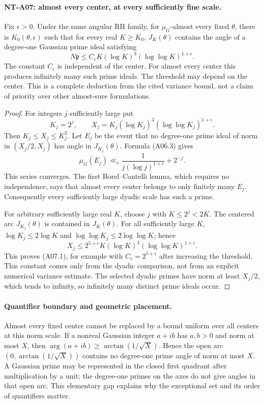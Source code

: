 \paragraph{NT-A07: almost every center, at every sufficiently fine scale.}
Fix \(\epsilon>0\). Under the same angular RH family, for
\(\mu_G\)-almost every fixed \(\theta\), there is
\(K_0(\theta,\epsilon)\) such that for every real \(K\ge K_0\),
\(J_K(\theta)\) contains the angle of a degree-one Gaussian prime
ideal satisfying
\[
 N\mathfrak p\le C_\epsilon
              K(\log K)^3(\log\log K)^{1+\epsilon}.       \tag{A07.1}
\]
The constant \(C_\epsilon\) is independent of the center.
For almost every center this produces infinitely many such prime
ideals. The threshold may depend on the center. This is a
complete deduction from the cited variance bound, not a claim
of priority over other almost-sure formulations.

\begin{proof}
For integers \(j\) sufficiently large put
\[
 K_j=2^j,\qquad
 X_j=K_j(\log K_j)^3(\log\log K_j)^{1+\epsilon}.
\]
Then \(K_j\le X_j\le K_j^2\). Let \(E_j\) be the event that
no degree-one prime ideal of norm in \((X_j/2,X_j)\) has angle
in \(J_{K_j}(\theta)\). Formula (A06.3) gives
\[
 \mu_G(E_j)\ll_\epsilon
      \frac1{j(\log j)^{1+\epsilon}}+2^{-j}.
\]
This series converges. The first Borel--Cantelli lemma, which
requires no independence, says that almost every center belongs
to only finitely many \(E_j\). Consequently every sufficiently
large dyadic scale has such a prime.

For arbitrary sufficiently large real \(K\), choose \(j\) with
\(K\le 2^j<2K\). The centered arc \(J_{K_j}(\theta)\) is contained
in \(J_K(\theta)\). For all sufficiently large \(K\),
\(\log K_j\le2\log K\) and
\(\log\log K_j\le2\log\log K\); hence
\[
 X_j\le 2^{5+\epsilon}
           K(\log K)^3(\log\log K)^{1+\epsilon}.
\]
This proves (A07.1), for example with \(C_\epsilon=2^{5+\epsilon}\)
after increasing the threshold. This constant comes only from
the dyadic comparison, not from an explicit numerical variance
estimate. The selected dyadic primes have norm at least \(X_j/2\),
which tends to infinity, so infinitely many distinct prime ideals
occur.
\end{proof}

\paragraph{Quantifier boundary and geometric placement.}
Almost every fixed center cannot be replaced by a bound uniform
over all centers at this norm scale. If a nonreal Gaussian
integer \(a+ib\) has \(a,b>0\) and norm at most \(X\), then
\(\arg(a+ib)\ge\arctan(1/\sqrt X)\). Hence the open arc
\((0,\arctan(1/\sqrt X))\) contains no degree-one prime angle
of norm at most \(X\). A Gaussian prime may be represented in
the closed first quadrant after multiplication by a unit;
the degree-one primes on the axes do not give angles in that
open arc. This elementary gap explains why the exceptional set
and its order of quantifiers matter.

